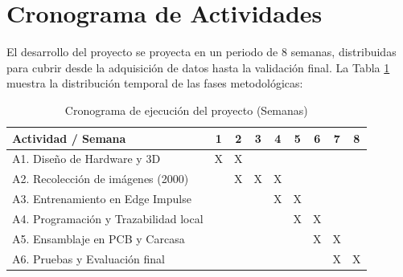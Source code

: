 \documentclass[12pt, letterpaper]{article}
\begin{document}
\section{Cronograma de Actividades}
El desarrollo del proyecto se proyecta en un periodo de 8 semanas, distribuidas para cubrir desde la adquisición de datos hasta la validación final. La Tabla \ref{tab:cronograma} muestra la distribución temporal de las fases metodológicas:

\begin{table}[H]
\centering
\caption{Cronograma de ejecución del proyecto (Semanas)}
\label{tab:cronograma}
\renewcommand{\arraystretch}{1.3}
\begin{tabularx}{\columnwidth}{X | c | c | c | c | c | c | c | c}
\toprule
\textbf{Actividad / Semana} & \textbf{1} & \textbf{2} & \textbf{3} & \textbf{4} & \textbf{5} & \textbf{6} & \textbf{7} & \textbf{8} \\
\midrule
A1. Diseño de Hardware y 3D & X & X & & & & & & \\
A2. Recolección de imágenes (2000) & & X & X & X & & & & \\
A3. Entrenamiento en Edge Impulse & & & & X & X & & & \\
A4. Programación y Trazabilidad local & & & & & X & X & & \\
A5. Ensamblaje en PCB y Carcasa & & & & & & X & X & \\
A6. Pruebas y Evaluación final & & & & & & & X & X \\
\bottomrule
\end{tabularx}
\end{table}

\newpage
\printbibliography
\end{document}
